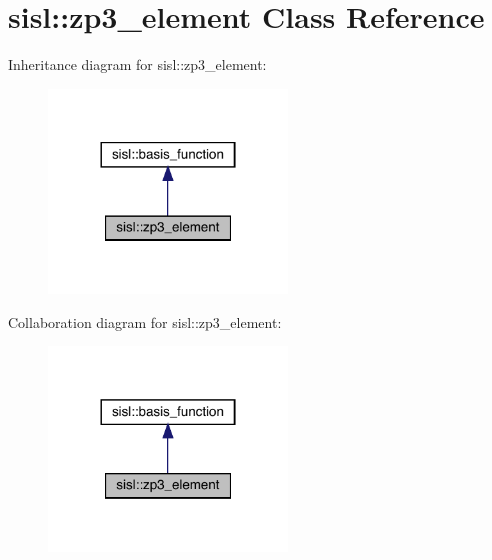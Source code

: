 \hypertarget{classsisl_1_1zp3__element}{}\section{sisl\+:\+:zp3\+\_\+element Class Reference}
\label{classsisl_1_1zp3__element}


Inheritance diagram for sisl\+:\+:zp3\+\_\+element\+:\nopagebreak
\begin{figure}[H]
\begin{center}
\leavevmode
\includegraphics[width=180pt]{classsisl_1_1zp3__element__inherit__graph}
\end{center}
\end{figure}


Collaboration diagram for sisl\+:\+:zp3\+\_\+element\+:\nopagebreak
\begin{figure}[H]
\begin{center}
\leavevmode
\includegraphics[width=180pt]{classsisl_1_1zp3__element__coll__graph}
\end{center}
\end{figure}
